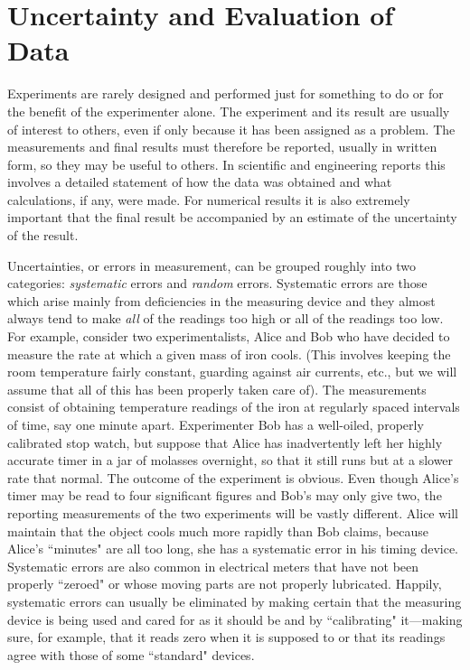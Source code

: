 \documentclass[main.tex]{subfiles}
\begin{document}
\section{Uncertainty and Evaluation of Data}\label{sec:Uncertainty}

Experiments are rarely designed and performed just for something to do or for the benefit of the experimenter alone.  The experiment and its result are usually of interest to others, even if only because it has been assigned as a problem.  The measurements and final results must therefore be reported, usually in written form, so they may be useful to others.  In scientific and engineering reports this involves a detailed statement of how the data was obtained and what calculations, if any, were made.  For numerical results it is also extremely important that the final result be accompanied by an estimate of the uncertainty of the result.

Uncertainties, or errors in measurement, can be grouped roughly into two categories: \emph{systematic} errors and \emph{random} errors.  Systematic errors are those which arise mainly from deficiencies in the measuring device and they almost always tend to make \emph{all} of the readings too high or all of the readings too low.  For example, consider two experimentalists, Alice and Bob who have decided to measure the rate at which a given mass of iron cools. (This involves keeping the room temperature fairly constant, guarding against air currents, etc., but we will assume that all of this has been properly taken care of).  The measurements consist of obtaining temperature readings of the iron at regularly spaced intervals of time, say one minute apart.  Experimenter Bob has a well-oiled, properly calibrated stop watch, but suppose that Alice has inadvertently left her highly accurate timer in a jar of molasses overnight, so that it still runs but at a slower rate that normal.  The outcome of the experiment is obvious.  Even though Alice's timer may be read to four significant figures and Bob's may only give two, the reporting measurements of the two experiments will be vastly different.  Alice will maintain that the object cools much more rapidly than Bob claims, because Alice's ``minutes" are all too long, she has a systematic error in his timing device.  Systematic errors are also common in electrical meters that have not been properly ``zeroed" or whose moving parts are not properly lubricated.  Happily, systematic errors can usually be eliminated by making certain that the measuring device is being used and cared for as it should be and by ``calibrating" it---making sure, for example, that it reads zero when it is supposed to or that its readings agree with those of some ``standard" devices. 
\end{document}
